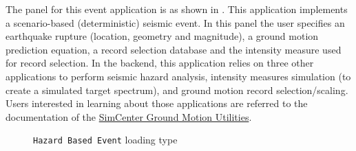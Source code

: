The panel for this event application is as shown in
. This application implements a scenario-based
(deterministic) seismic event.  In this panel the user specifies an
earthquake rupture (location, geometry and magnitude), a ground motion
prediction equation, a record selection database and the intensity
measure used for record selection. In the backend, this application
relies on three other applications to perform seismic hazard analysis,
intensity measures simulation (to create a simulated target spectrum),
and ground motion record selection/scaling. Users interested in
learning about those applications are referred to the documentation of
the
\href{https://github.com/NHERI-SimCenter/GroundMotionUtilities/blob/master/Readme.md}{SimCenter
  Ground Motion Utilities}.

\begin{figure}[!htbp]
  \caption{\texttt{Hazard Based Event} loading type}
  \label{fig:figure7}
\end{figure}
